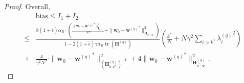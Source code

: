 \documentclass[11pt, letterpaper]{article}
\begin{document}
\begin{proof}
    Overall, 
    \begin{equation*}
        \begin{aligned}
            &\mathrm{bias}\leq I_1+I_2\\
            \leq& \frac{8(1+\tilde{\epsilon})\alpha_B\cdot\left(\frac{\|\mathbf{w}_{0}-{\mathbf{w}^{(q)}}^{*}\|_{\mathbf{I}_{0:k^{*}}}^{2}}{N\gamma}+\|\mathbf{w}_{0}-{\mathbf{w}^{(q)}}^{*}\|_{\mathbf{H}_{k^{*}:\infty}}^{2}\right)}{1-2(1+\tilde{\epsilon})\gamma\alpha_B\operatorname{tr}(\mathbf{H}^{(q)})}\left(\frac{k^*}{N} + {N\gamma^2}\sum_{i> k^*}{\lambda_i^{(q)}}^2\right)\\
            +& \frac{4}{\gamma^2N^2}\cdot\|\mathbf{w}_0-{\mathbf{w}^{(q)}}^*\|_{(\mathbf{H}_{0:k^*}^{(q)})^{-1}}^2+4\|\mathbf{w}_0-{\mathbf{w}^{(q)}}^*\|_{\mathbf{H}_{{k^*}:\infty}^{(q)}}^2.
        \end{aligned}
    \end{equation*}
\end{proof}
\end{document}
